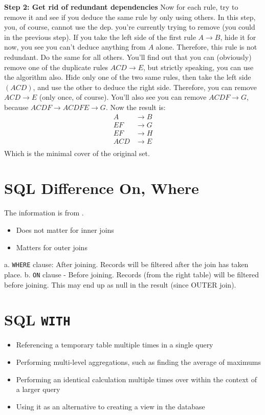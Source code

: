 \documentclass{article}
\begin{document}
\textbf{Step 2: Get rid of redundant dependencies}
Now for each rule, try to remove it and see if you deduce the same rule by only using others. In this step, you, of course, cannot use the dep. you're currently trying to remove (you could in the previous step).
If you take the left side of the first rule $A \rightarrow B$, hide it for now, you see you can't deduce anything from $A$ alone. Therefore, this rule is not redundant. Do the same for all others. You'll find out that you can (obviously) remove one of the duplicate rules $ACD \rightarrow E$, but strictly speaking, you can use the algorithm also. Hide only one of the two same rules, then take the left side $(ACD)$, and use the other to deduce the right side. Therefore, you can remove $ACD \rightarrow E$ (only once, of course).
You'll also see you can remove $ACDF \rightarrow G$, because $ACDF \rightarrow ACDFE \rightarrow G$. Now the result is:
\begin{align*}
    A   & \rightarrow B \\
    EF  & \rightarrow G \\
    EF  & \rightarrow H \\
    ACD & \rightarrow E \\
\end{align*}
Which is the minimal cover of the original set.
\section{SQL Difference On, Where}
The information is from \cite{sql-stackoverflow}.
\begin{itemize}
    \item Does not matter for inner joins
    \item Matters for outer joins
\end{itemize}
a. \texttt{WHERE} clause: After joining. Records will be filtered after the join has taken place.
b. \texttt{ON} clause - Before joining. Records (from the right table) will be filtered before joining. This may end up as null in the result (since OUTER join).
\section{SQL \texttt{WITH}}
\begin{itemize}
    \item Referencing a temporary table multiple times in a single query
    \item Performing multi-level aggregations, such as finding the average of maximums
    \item Performing an identical calculation multiple times over within the context of a
          larger query
    \item Using it as an alternative to creating a view in the database
\end{itemize}
\end{document}

